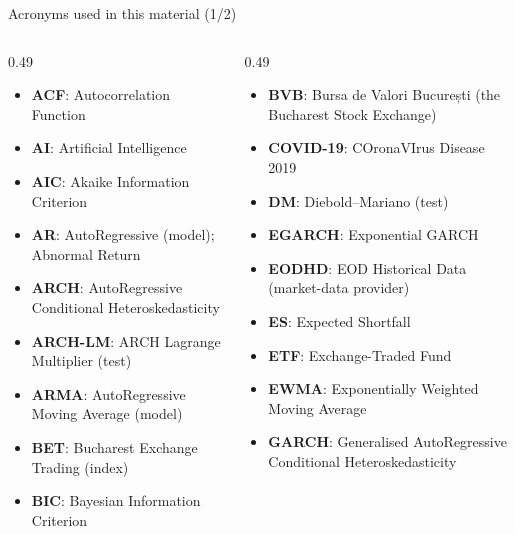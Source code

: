 {
\begin{frame}[noframenumbering]
    \titlepage
\end{frame}
}
\begin{frame}{Acronyms used in this material (1/2)}
\begin{columns}[T]
\begin{column}{0.49\textwidth}
\begin{itemize}\setlength{\itemsep}{0pt}
    \item \textbf{ACF}: Autocorrelation Function
    \item \textbf{AI}: Artificial Intelligence
    \item \textbf{AIC}: Akaike Information Criterion
    \item \textbf{AR}: AutoRegressive (model); Abnormal Return
    \item \textbf{ARCH}: AutoRegressive Conditional Heteroskedasticity
    \item \textbf{ARCH-LM}: ARCH Lagrange Multiplier (test)
    \item \textbf{ARMA}: AutoRegressive Moving Average (model)
    \item \textbf{BET}: Bucharest Exchange Trading (index)
    \item \textbf{BIC}: Bayesian Information Criterion
\end{itemize}
\end{column}
\begin{column}{0.49\textwidth}
\begin{itemize}\setlength{\itemsep}{0pt}
    \item \textbf{BVB}: Bursa de Valori București (the Bucharest Stock Exchange)
    \item \textbf{COVID-19}: COronaVIrus Disease 2019
    \item \textbf{DM}: Diebold–Mariano (test)
    \item \textbf{EGARCH}: Exponential GARCH
    \item \textbf{EODHD}: EOD Historical Data (market-data provider)
    \item \textbf{ES}: Expected Shortfall
    \item \textbf{ETF}: Exchange-Traded Fund
    \item \textbf{EWMA}: Exponentially Weighted Moving Average
    \item \textbf{GARCH}: Generalised AutoRegressive Conditional Heteroskedasticity
\end{itemize}
\end{column}
\end{columns}
\end{frame}
